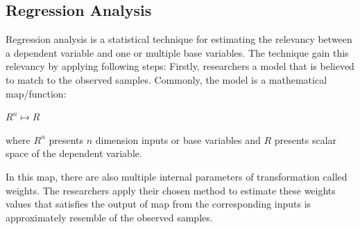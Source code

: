 
\subsection{Regression Analysis}

Regression analysis is a statistical technique for estimating
the relevancy between a dependent variable and one or multiple base variables.
The technique gain this relevancy by applying following steps:
Firstly, researchers a model that is believed to match to the observed samples.
Commonly, the model is a mathematical map/function:

\begin{center}
    $R^{n} \mapsto R$
\end{center}

where $R^{n}$ presents $n$ dimension inputs or base variables
and $R$ presents scalar space of the dependent variable.

In this map, there are also multiple internal parameters of transformation called weights.
The researchers apply their chosen method to estimate these weights values
that satisfies the output of map from the corresponding inputs is approximately resemble of the observed samples.


